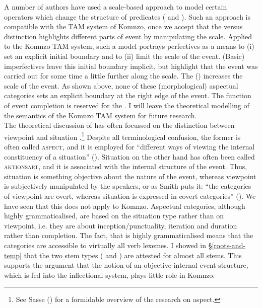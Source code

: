 A number of authors have used a scale-based approach to model certain operators which change the structure of predicates (\citealt{Kennedy:2005fy} and \citealt{Kubota:2010bx}). Such an approach is compatible with the TAM system of Komnzo, once we accept that the  versus  distinction highlights different parts of event by manipulating the  scale. Applied to the Komnzo TAM system, such a model portrays perfectives as a means to (i) set an explicit initial boundary and to (ii) limit the  scale of the event. (Basic) imperfectives leave this initial boundary implicit, but highlight that the event was carried out for some time \textendash{} a little further along the scale. The  () increases the  scale of the event. As shown above, none of these (morphological) aspectual categories sets an explicit boundary at the right edge of the event. The function of event completion is reserved for the  . I will leave the theoretical modelling of the semantics of the Komnzo TAM system for future research.\\

The theoretical discussion of  has often focussed on the distinction between viewpoint  and situation .\footnote{See Sasse (\citeyear{Sasse:2002vn}) for a formidable overview of the research on aspect.} Despite all terminological confusion, the former is often called \textsc{aspect}, and it is employed for ``different ways of viewing the internal constituency of a situation'' (\citealt[3]{Comrie:1976vd}). Situation  on the other hand has often been called \textsc{aktionsart}, and it is associated with the internal structure of the event. Thus, situation  is something objective about the nature of the event, whereas viewpoint  is subjectively manipulated by the speakers, or as Smith puts it: ``the categories of viewpoint  are overt, whereas situation  is expressed in covert categories'' (\citeyear[5]{Smith:1997tq}). We have seen that this does not apply to Komnzo. Aspectual categories, although highly grammaticalised, are based on the situation type rather than on viewpoint, i.e. they are about inception/punctuality, iteration and duration rather than completion. The fact, that  is highly grammaticalised means that the categories are accessible to virtually all verb lexemes. I showed in \S{}\ref{roots-and-temp} that the two stem types (\Rs{} and \Ext{}) are attested for almost all stems. This supports the argument that the notion of an objective internal event structure, which is fed into the inflectional system, plays little role in Komnzo.\\

